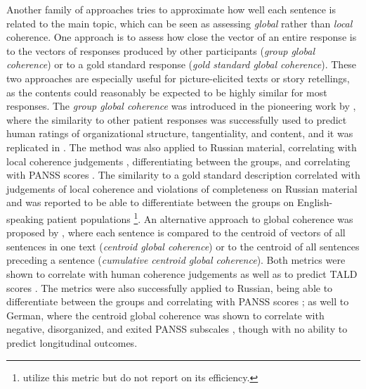 
Another family of approaches tries to approximate how well each sentence is related to the main topic, which can be seen as assessing \textit{global} rather than \textit{local} coherence. One approach is to assess how close the vector of an entire response is to the vectors of responses produced by other participants (\textit{group global coherence}) or to a gold standard response (\textit{gold standard global coherence}). These two approaches are especially useful for picture-elicited texts or story retellings, as the contents could reasonably be expected to be highly similar for most responses. The \textit{group global coherence} was introduced in the pioneering work by \cite{elvevaag2007quantifying}, where the similarity to other patient responses was successfully used to predict human ratings of organizational structure, tangentiality, and content, and it was replicated in \citet{elvevaag2010automated}. The method was also applied to Russian material, correlating with local coherence judgements \citep{ryazanskaya2020automated}, differentiating between the groups, and correlating with PANSS scores \citep{ryazanskaya2020thesis}. The similarity to a gold standard description correlated with judgements of local coherence and violations of completeness on Russian material \citep{ryazanskaya2020automated} and was reported to be able to differentiate between the groups on English-speaking patient populations \citep{morgan2021natural}\footnote{\cite{nettekoven2023semantic} utilize this metric but do not report on its efficiency.}. An alternative approach to global coherence was proposed by \citet{xu2020centroid}, where each sentence is compared to the centroid of vectors of all sentences in one text (\textit{centroid global coherence}) or to the centroid of all sentences preceding a sentence (\textit{cumulative centroid global coherence}). Both metrics were shown to correlate with human coherence judgements \citep{xu2020centroid, xu2022fully} as well as to predict TALD scores \citep{xu2022fully}. The metrics were also successfully applied to Russian, being able to differentiate between the groups and correlating with PANSS scores \citep{ryazanskaya2020thesis}; as well to German, where the centroid global coherence was shown to correlate with negative, disorganized, and exited PANSS subscales \citep{just2023validation}, though with no ability to predict longitudinal outcomes.


